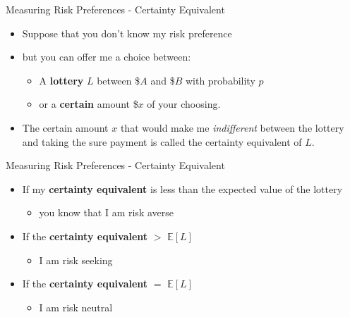 
\begin{frame}{Measuring Risk Preferences - Certainty Equivalent}
  \begin{itemize}
    \item Suppose that you don't know my risk preference 
    \item but you can offer me a choice between: 
    \begin{itemize}
      \item A \textbf{lottery} $L$ between \$$A$ and \$$B$ with probability $p$
      \item or a \textbf{certain} amount \$$x$ of your choosing. 
    \end{itemize}
    \item The certain amount $x$ that would make me \textit{indifferent}
    between the lottery and taking the sure payment 
    is called the \alert{certainty equivalent} of $L$.
  \end{itemize}
\end{frame}


\begin{frame}{Measuring Risk Preferences - Certainty Equivalent}
  \begin{itemize}
    \item If my \textbf{certainty equivalent} 
    is less than the expected value of the lottery 
    \begin{itemize}
      \item you know that I am \alert{risk averse} 
    \end{itemize}
    \item If the \textbf{certainty equivalent} $>$ \textbf{$\mathbb{E}[L]$} 
    \begin{itemize}
      \item I am \alert{risk seeking}
    \end{itemize}
    \item If the \textbf{certainty equivalent} $=$ \textbf{$\mathbb{E}[L]$}
    \begin{itemize}
      \item I am \alert{risk neutral} 
    \end{itemize}
  \end{itemize} 
\end{frame}

